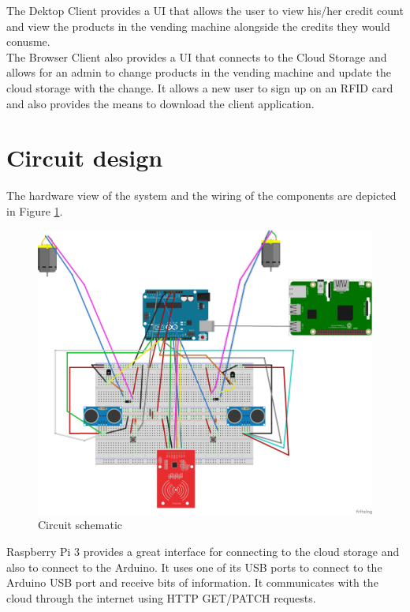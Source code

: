 \documentclass[a4paper,11pt]{article}
\begin{document}
The Dektop Client provides a UI that allows the user to view his/her credit count and view the products in the vending machine alongside the credits they would conusme.\\

The Browser Client also provides a UI that connects to the Cloud Storage and allows for an admin to change products in the vending machine and update the cloud storage with the change. It allows a new user to sign up on an RFID card and also provides the means to download the client application.

\section{Circuit design}

The hardware view of the system and the wiring of the components are depicted in Figure \ref{fig:circuit-design}.

\begin{figure}[h]
\centering
\includegraphics[scale=0.3]{CircuitDesign.png}
\caption{Circuit schematic}
\label{fig:circuit-design}
\end{figure}

Raspberry Pi 3 provides a great interface for connecting to the cloud storage and also to connect to the Arduino. It uses one of its USB ports to connect to the Arduino USB port and receive bits of information. It communicates with the cloud through the internet using HTTP GET/PATCH requests. \\
\end{document}
